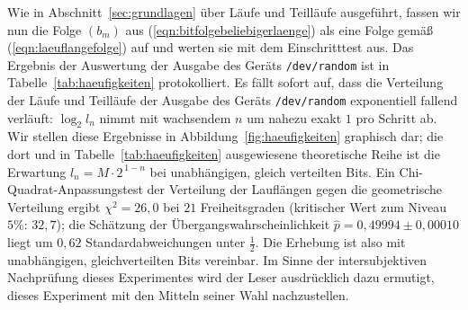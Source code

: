 \documentclass[11pt,a4paper]{scrartcl}
\theoremstyle{plain}
\theoremstyle{definition}
\theoremstyle{remark}
\begin{document}
\noindent Wie in Abschnitt~\ref{sec:grundlagen} über Läufe und
Teilläufe ausgeführt, fassen wir nun die Folge $(b_m)$ aus
(\ref{eqn:bitfolgebeliebigerlaenge}) als eine Folge gemäß
(\ref{eqn:laeuflangefolge}) auf und werten sie mit dem Einschritttest
aus. Das Ergebnis der Auswertung der Ausgabe des Geräts
\texttt{/dev/random} ist in Tabelle~\ref{tab:haeufigkeiten}
protokolliert. Es fällt sofort auf, dass die Verteilung der Läufe und
Teilläufe der Ausgabe des Geräts \texttt{/dev/random} exponentiell
fallend verläuft: $\log_2 l_n$ nimmt mit wachsendem $n$ um nahezu
exakt $1$ pro Schritt ab. Wir stellen diese Ergebnisse in
Abbildung~\ref{fig:haeufigkeiten} graphisch dar; die dort und in
Tabelle~\ref{tab:haeufigkeiten} ausgewiesene theoretische Reihe ist
die Erwartung $l_n=M\cdot 2^{\,1-n}$ bei unabhängigen, gleich
verteilten Bits. Ein Chi-Quadrat-Anpassungstest der Verteilung der
Lauflängen gegen die geometrische Verteilung ergibt $\chi^2=26{,}0$
bei $21$ Freiheitsgraden (kritischer Wert zum Niveau $5\%$:
$32{,}7$); die Schätzung der Übergangswahrscheinlichkeit
$\hat p=0{,}49994\pm 0{,}00010$ liegt um $0{,}62$
Standardabweichungen unter $\tfrac12$. Die Erhebung ist also mit
unabhängigen, gleichverteilten Bits vereinbar. Im Sinne der
intersubjektiven Nachprüfung dieses Experimentes wird der Leser
ausdrücklich dazu ermutigt, dieses Experiment mit den Mitteln seiner
Wahl nachzustellen.
\end{document}
